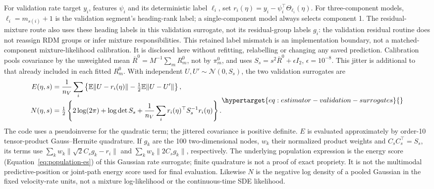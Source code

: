 For validation rate target \(y_i\), features \(\psi_i\) and its deterministic
label \(\ell_i\), set \(r_i(\eta)=y_i-\psi_i^\top\Theta_{\ell_i}(\eta)\).
For three-component models, \(\ell_i=m_{s(i)}+1\) is the validation
segment's heading-rank label; a single-component model always selects
component 1. The residual-mixture route also uses these heading labels in
this validation surrogate, not its residual-group labels \(g_i\): the
validation residual routine does not reassign RDM groups or infer mixture
responsibilities. This retained label mismatch is an implementation boundary,
not a matched-component mixture-likelihood calibration. It is disclosed here
without refitting, relabelling or changing any saved prediction.
Calibration pools covariance by the unweighted mean
\(\overline R^0=M^{-1}\sum_mR_m^0\), not by \(\pi_m^0\), and uses
\(S_s=s^2\overline R^0+\epsilon I_2\), \(\epsilon=10^{-8}\).
This jitter is additional to that already included in each fitted \(R_m^0\).
With independent \(U,U'\sim\mathcal N(0,S_s)\), the two validation surrogates
are
\begin{equation}
\begin{aligned}
E(\eta,s)&=\frac1{n_V}\sum_i
 \left\{\mathbb E\|U-r_i(\eta)\|-\tfrac12\mathbb E\|U-U'\|\right\},\\
N(\eta,s)&=\tfrac12\left\{2\log(2\pi)+\log\det S_s
 +\frac1{n_V}\sum_i r_i(\eta)^\top S_s^{-1}r_i(\eta)\right\}.
\end{aligned}
\label{eq:estimator-validation-surrogates}\hypertarget{eq:estimator-validation-surrogates}{}
\end{equation}
The code uses a pseudoinverse for the quadratic term; the jittered covariance
is positive definite. \(E\) is evaluated approximately by order-10
tensor-product Gauss--Hermite quadrature. If \(g_k\) are the 100 two-dimensional
nodes, \(w_k\) their normalized product weights and \(C_sC_s^\top=S_s\),
its terms use \(\sum_kw_k\|\sqrt2C_sg_k-r_i\|\) and
\(\sum_kw_k\|2C_sg_k\|\), respectively.
The underlying population expression is the energy score
(Equation~\eqref{eq:population-es}) of this Gaussian rate surrogate;
finite quadrature is not a proof of exact propriety.
It is not the multimodal predictive-position or joint-path energy score
used for final evaluation. Likewise \(N\) is the negative log density of
a pooled Gaussian in the fixed velocity-rate units, not a mixture
log-likelihood or the continuous-time SDE likelihood.

